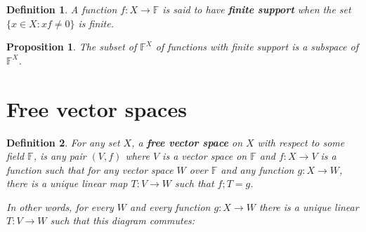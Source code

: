 \documentclass[a4paper,14pt]{article}
\newtheorem*{prop}{Proposition}
\newtheorem*{defn}{Definition}
\begin{document}
\begin{defn}
A function $f: X \to \mathbb{F}$ is said to have \textbf{finite support} when the set $\{x \in X : xf \neq 0\}$ is finite.
\end{defn}

\begin{prop}
The subset of $\mathbb{F}^X$ of functions with finite support is a subspace of $\mathbb{F}^X$.
\end{prop}

\section{Free vector spaces}
\begin{defn}
For any set $X$, a \textbf{free vector space} on $X$ with respect to some field $\mathbb{F}$, is any pair $(V, f)$ where $V$ is a vector space on $\mathbb{F}$ and $f: X \to V$ is a function such that for any vector space $W$ over $\mathbb{F}$ and any function $g: X \to W$, there is a unique linear map $T: V \to W$ such that $f;T = g$.

In other words, for every $W$ and every function $g: X \to W$ there is a unique linear $T: V \to W$ such that this diagram commutes:

\begin{center}
\end{center}
\end{defn}
\end{document}
